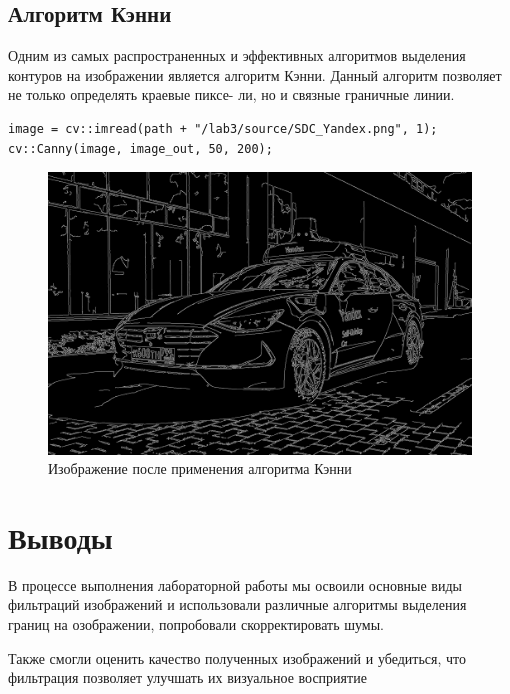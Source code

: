 \pagebreak

\subsection{Алгоритм Кэнни}

Одним из самых распространенных и эффективных алгоритмов
выделения контуров на изображении является алгоритм Кэнни.
Данный алгоритм позволяет не только определять краевые пиксе-
ли, но и связные граничные линии.

\begin{lstlisting}[style=cpp_white, caption={Исходный код применения алгоритма Кэнни}]
image = cv::imread(path + "/lab3/source/SDC_Yandex.png", 1);
cv::Canny(image, image_out, 50, 200);
\end{lstlisting}

\begin{figure}[ht]
    \centering
    \includegraphics[width=\textwidth]{../outputs/canny_operator.png}
    \caption{Изображение после применения алгоритма Кэнни}
    \label{fig:stitch_images}
\end{figure}

\pagebreak

\section{Выводы}
В процессе выполнения лабораторной работы мы освоили основные виды фильтраций изображений и использовали различные алгоритмы выделения границ на озображении, попробовали скорректировать шумы. 

Также смогли оценить качество полученных изображений и убедиться, что фильтрация позволяет улучшать их визуальное восприятие

